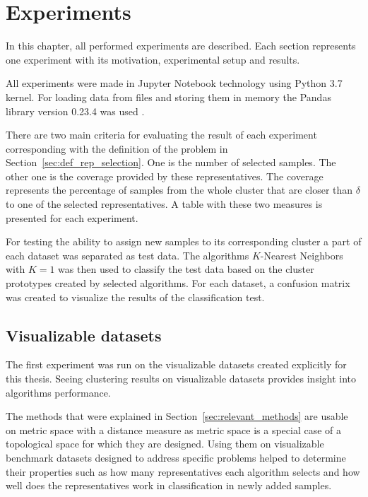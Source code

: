 \documentclass[thesis=B,english]{FITthesis}[2012/10/20]
\begin{document}

\chapter{Experiments}\label{ch:experiments}

In this chapter, all performed experiments are described.
Each section represents one experiment with its motivation, experimental setup and results.

All experiments were made in Jupyter Notebook technology using Python 3.7 kernel.
For loading data from files and storing them in memory the Pandas library version 0.23.4 was used \cite{mckinney2010data}.

There are two main criteria for evaluating the result of each experiment corresponding with the definition of the problem in Section~\ref{sec:def_rep_selection}.
One is the number of selected samples.
The other one is the coverage provided by these representatives.
The coverage represents the percentage of samples from the whole cluster that are closer than $\delta$ to one of the selected representatives.
A table with these two measures is presented for each experiment.

For testing the ability to assign new samples to its corresponding cluster a part of each dataset was separated as test data.
The algorithms $K$-Nearest Neighbors with $K=1$ was then used to classify the test data based on the cluster prototypes created by selected algorithms.
For each dataset, a confusion matrix was created to visualize the results of the classification test.

\section{Visualizable datasets}\label{sec:exp1}

The first experiment was run on the visualizable datasets created explicitly for this thesis.
Seeing clustering results on visualizable datasets provides insight into algorithms performance.

The methods that were explained in Section~\ref{sec:relevant_methods} are usable on metric space with a distance measure as metric space is a special case of a topological space for which they are designed.
Using them on visualizable benchmark datasets designed to address specific problems helped to determine their properties such as how many representatives each algorithm selects and how well does the representatives work in classification in newly added samples.
\end{document}
